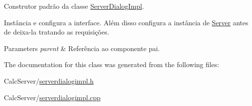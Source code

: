 Construtor padrão da classe \hyperlink{classServerDialogImpl}{Server\+Dialog\+Impl}. 

Instância e configura a interface. Além disso configura a instância de \hyperlink{classServer}{Server} antes de deixa-\/la tratando as requisições.


\begin{DoxyParams}{Parameters}
{\em parent} & Referência ao componente pai. \\
\hline
\end{DoxyParams}


The documentation for this class was generated from the following files\+:\begin{DoxyCompactItemize}
\item 
Calc\+Server/\hyperlink{serverdialogimpl_8h}{serverdialogimpl.\+h}\item 
Calc\+Server/\hyperlink{serverdialogimpl_8cpp}{serverdialogimpl.\+cpp}\end{DoxyCompactItemize}
